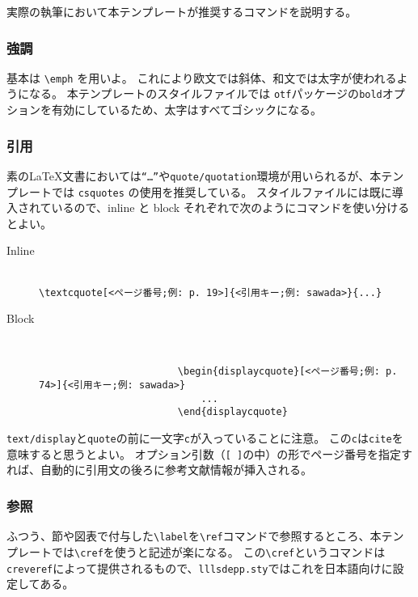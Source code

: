 			実際の執筆において本テンプレートが推奨するコマンドを説明する。

			\subsubsection{強調}

				基本は \texttt{\textbackslash emph} を用いよ。
				これにより欧文では斜体、和文では太字が使われるようになる。
				本テンプレートのスタイルファイルでは \texttt{otf}パッケージの\texttt{bold}オプションを有効にしているため、太字はすべてゴシックになる。

			\subsubsection{引用}

				素の\LaTeX 文書においては\texttt{``\dots''}や\texttt{quote/quotation}環境が用いられるが、本テンプレートでは \texttt{csquotes} の使用を推奨している。
				スタイルファイルには既に導入されているので、inline と block それぞれで次のようにコマンドを使い分けるとよい。

				\begin{description}
					\item[Inline] 　\\
						\verb|\textcquote[<ページ番号;例: p. 19>]{<引用キー;例: sawada>}{...}|
					\item[Block] 　
					\begin{verbatim}
						\begin{displaycquote}[<ページ番号;例: p. 74>]{<引用キー;例: sawada>}
							...
						\end{displaycquote}
					\end{verbatim}
				\end{description}

				\noindent
				\texttt{text/display}と\texttt{quote}の前に一文字\texttt{c}が入っていることに注意。
				この\texttt{c}は\texttt{cite}を意味すると思うとよい。
				オプション引数（\texttt{[ ]}の中）の形でページ番号を指定すれば、自動的に引用文の後ろに参考文献情報が挿入される。

			\subsubsection{参照}

				ふつう、節や図表で付与した\verb|\label|を\verb|\ref|コマンドで参照するところ、本テンプレートでは\verb|\cref|を使うと記述が楽になる。
				この\verb|\cref|というコマンドは\texttt{creveref}によって提供されるもので、\texttt{lllsdepp.sty}ではこれを日本語向けに設定してある。


